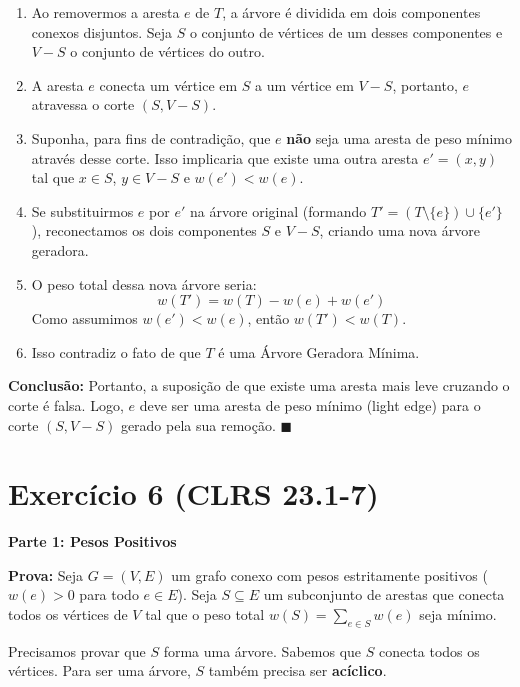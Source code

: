 \documentclass[a4paper,12pt]{article}
\begin{document}
\begin{enumerate}
    \item Ao removermos a aresta $e$ de $T$, a árvore é dividida em dois componentes conexos disjuntos. Seja $S$ o conjunto de vértices de um desses componentes e $V-S$ o conjunto de vértices do outro.
    
    \item A aresta $e$ conecta um vértice em $S$ a um vértice em $V-S$, portanto, $e$ atravessa o corte $(S, V-S)$.
    
    \item Suponha, para fins de contradição, que $e$ \textbf{não} seja uma aresta de peso mínimo através desse corte. Isso implicaria que existe uma outra aresta $e' = (x, y)$ tal que $x \in S$, $y \in V-S$ e $w(e') < w(e)$.
    
    \item Se substituirmos $e$ por $e'$ na árvore original (formando $T' = (T \setminus \{e\}) \cup \{e'\}$), reconectamos os dois componentes $S$ e $V-S$, criando uma nova árvore geradora.
    
    \item O peso total dessa nova árvore seria:
    $$w(T') = w(T) - w(e) + w(e')$$
    Como assumimos $w(e') < w(e)$, então $w(T') < w(T)$.
    
    \item Isso contradiz o fato de que $T$ é uma Árvore Geradora Mínima.
\end{enumerate}

\textbf{Conclusão:} Portanto, a suposição de que existe uma aresta mais leve cruzando o corte é falsa. Logo, $e$ deve ser uma aresta de peso mínimo (light edge) para o corte $(S, V-S)$ gerado pela sua remoção. $\blacksquare$

\newpage
\section*{Exercício 6 (CLRS 23.1-7)}

\textbf{Parte 1: Pesos Positivos}

\textbf{Prova:}
Seja $G=(V, E)$ um grafo conexo com pesos estritamente positivos ($w(e) > 0$ para todo $e \in E$).
Seja $S \subseteq E$ um subconjunto de arestas que conecta todos os vértices de $V$ tal que o peso total $w(S) = \sum_{e \in S} w(e)$ seja mínimo.

Precisamos provar que $S$ forma uma árvore.
Sabemos que $S$ conecta todos os vértices. Para ser uma árvore, $S$ também precisa ser \textbf{acíclico}.
\end{document}
